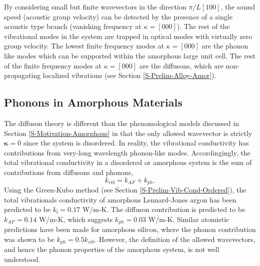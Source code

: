 \documentclass[letterpaper,12pt]{article}
\begin{document}
By considering small but finite wavevectors in the direction $\pi/L[1 0 0]$, the sound speed (acoustic group velocity) can be detected by the presence of a single acoustic type branch (vanishing frequency at $\kappa=[0 0 0]$).  The rest of the vibrational modes in the system are trapped in optical modes with virtually zero group velocity. The lowest finite frequency modes at $\kappa=[0 0 0]$ are the phonon like modes which can be supported within the amorphous large unit cell.\cite{allen1993,PhysRevE.81.021301} The rest of the finite frequency modes at $\kappa=[0 0 0]$ are the diffusons, which are non-propagating localized vibrations (see Section \ref{S-Prelim-Alloy-Amor}). 
\subsection{\label{S-Prelim-Phonons-Amor} Phonons in Amorphous Materials }

The diffuson theory is different than the phenomological models discussed in Section \ref{S-Motivation-Amorphous} in that the only allowed wavevector is strictly $\mathbf{\kappa}= 0$ since the system is disordered. In reality, the vibrational conductivity has contributions from very-long wavelength phonon-like modes. Accordingingly, the total vibrational conductivity in a disordered or amorphous system is the sum of contributions from diffusons and phonons,
\begin{equation}\label{EQ:M:k_thermal}
k_{vib} = k_{AF} + k_{ph}.
\end{equation}
Using the Green-Kubo method (see Section \ref{S-Prelim-Vib-Cond-Ordered}), the total vibrationals conductivity of amorphous Lennard-Jones argon has been predicted to be $k_{l}=0.17$ W/m-K. The diffuson contribution is predicted to be $k_{AF} = 0.14$ W/m-K, which suggests $k_{ph} = 0.03$ W/m-K. Similar atomistic predictions have been made for amorphous silicon, where the phonon contribution was shown to be $k_{ph} = 0.5k_{vib}$.\cite{He2011a} However, the definition of the allowed wavevectors, and hence the phonon properties of the amorphous system, is not well understood.\cite{He2011a}

\clearpage
\end{document}
